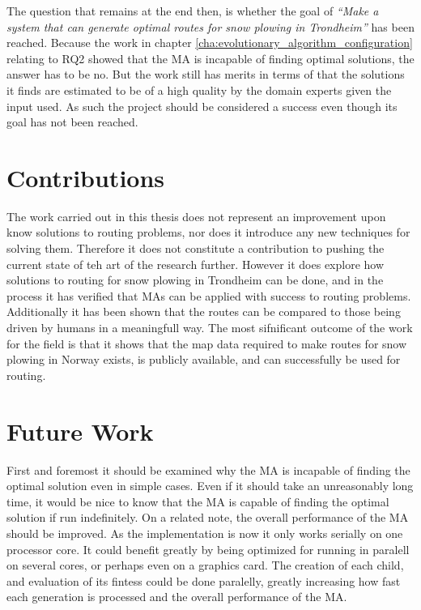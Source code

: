 The question that remains at the end then, is whether the goal of \emph{\enquote{Make a system that can generate optimal routes for snow plowing in Trondheim}} has been reached. Because the work in chapter \ref{cha:evolutionary_algorithm_configuration} relating to RQ2 showed that the MA is incapable of finding optimal solutions, the answer has to be no. But the work still has merits in terms of that the solutions it finds are estimated to be of a high quality by the domain experts given the input used. As such the project should be considered a success even though its goal has not been reached.





\section{Contributions}

The work carried out in this thesis does not represent an improvement upon know solutions to routing problems, nor does it introduce any new techniques for solving them. Therefore it does not constitute a contribution to pushing the current state of teh art of the research further. However it does explore how solutions to routing for snow plowing in Trondheim can be done, and in the process it has verified that MAs can be applied with success to routing problems. Additionally it has been shown that the routes can be compared to those being driven by humans in a meaningfull way. The most sifnificant outcome of the work for the field is that it shows that the map data required to make routes for snow plowing in Norway exists, is publicly available, and can successfully be used for routing.

\section{Future Work}

First and foremost it should be examined why the MA is incapable of finding the optimal solution even in simple cases. Even if it should take an unreasonably long time, it would be nice to know that the MA is capable of finding the optimal solution if run indefinitely. On a related note, the overall performance of the MA should be improved. As the implementation is now it only works serially on one processor core. It could benefit greatly by being optimized for running in paralell on several cores, or perhaps even on a graphics card. The creation of each child, and evaluation of its fintess could be done paralelly, greatly increasing how fast each generation is processed and the overall performance of the MA.

